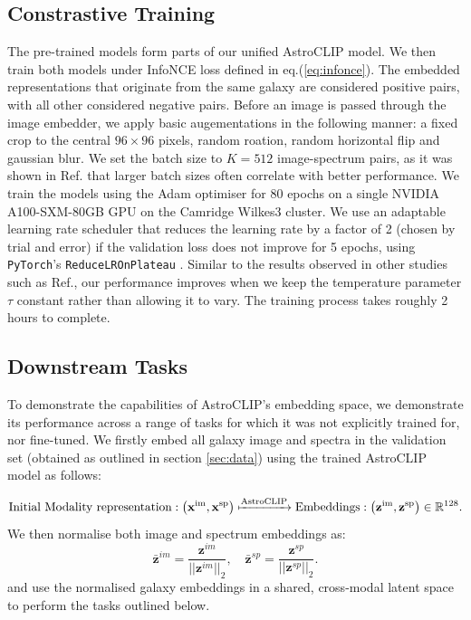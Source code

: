 \documentclass[a4paper,12pt]{article}
\begin{document}
\subsection{Constrastive Training}
The pre-trained models form parts of our unified AstroCLIP model. We then train both models under InfoNCE loss defined in eq.(\ref{eq:infonce}). The embedded representations that originate from the same galaxy are considered positive pairs, with all other considered negative pairs. Before an image is passed through the image embedder, we apply basic augementations in the following manner: a fixed crop to the central $96 \times 96$ pixels, random roation, random horizontal flip and gaussian blur. We set the batch size to $K=512$ image-spectrum pairs, as it was shown in Ref.\cite{radford2021learning} that larger batch sizes often correlate with better performance. We train the models using the Adam optimiser \cite{adam} for 80 epochs on a single NVIDIA A100-SXM-80GB GPU on the Camridge Wilkes3 cluster. We use an adaptable learning rate scheduler that reduces the learning rate by a factor of 2 (chosen by trial and error) if the validation loss does not improve for 5 epochs, using \verb|PyTorch|'s \verb|ReduceLROnPlateau| \cite{LRon}. Similar to the results observed in other studies such as Ref.\cite{gir},  our performance improves when we keep the temperature parameter $\tau$ constant rather than allowing it to vary. The training process takes roughly 2 hours to complete.

\subsection{Downstream Tasks}
To demonstrate the capabilities of AstroCLIP's embedding space, we demonstrate its performance across a range of tasks for which it was not explicitly trained for, nor fine-tuned. We firstly embed all galaxy image and spectra in the validation set (obtained as outlined in section \ref{sec:data}) using the trained AstroCLIP model as follows:

\begin{equation}
    \text{Initial Modality representation} : \left( \mathbf{x}^{\text{im}}, \mathbf{x}^{\text{sp}} \right) \xmapsto{\text{AstroCLIP}} \text{Embeddings} : \left( \mathbf{z}^{\text{im}}, \mathbf{z}^{\text{sp}} \right) \in \mathbb{R}^{128}.
\end{equation}
We then normalise both image and spectrum embeddings as:
\begin{equation}
    \mathbf{\bar{z}}^{im} =  \frac{\mathbf{z}^{im} }{|| \mathbf{z}^{im} ||_2}, \quad \mathbf{\bar{z}}^{sp} =  \frac{\mathbf{z}^{sp} }{|| \mathbf{z}^{sp} ||_2}.
\end{equation}
and use the normalised galaxy embeddings in a shared, cross-modal latent space to perform the tasks outlined below.
\end{document}
